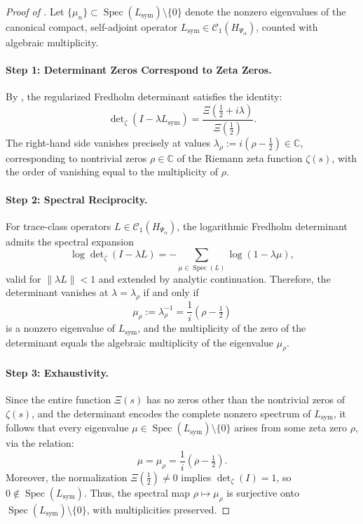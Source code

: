 \begin{proof}[Proof of ]
Let \( \{ \mu_n \} \subset \operatorname{Spec}(L_{\mathrm{sym}}) \setminus \{0\} \) denote the nonzero eigenvalues of the canonical compact, self-adjoint operator \( L_{\mathrm{sym}} \in \mathcal{C}_1(H_{\Psi_\alpha}) \), counted with algebraic multiplicity.

\paragraph{Step 1: Determinant Zeros Correspond to Zeta Zeros.}
By , the regularized Fredholm determinant satisfies the identity:
\[
\det\nolimits_\zeta(I - \lambda L_{\mathrm{sym}}) = \frac{\Xi(\tfrac{1}{2} + i\lambda)}{\Xi(\tfrac{1}{2})}.
\]
The right-hand side vanishes precisely at values \( \lambda_\rho := i(\rho - \tfrac{1}{2}) \in \mathbb{C} \), corresponding to nontrivial zeros \( \rho \in \mathbb{C} \) of the Riemann zeta function \( \zeta(s) \), with the order of vanishing equal to the multiplicity of \( \rho \).

\paragraph{Step 2: Spectral Reciprocity.}
For trace-class operators \( L \in \mathcal{C}_1(H_{\Psi_\alpha}) \), the logarithmic Fredholm determinant admits the spectral expansion
\[
\log \det\nolimits_\zeta(I - \lambda L) = -\sum_{\mu \in \operatorname{Spec}(L)} \log(1 - \lambda \mu),
\]
valid for \( \|\lambda L\| < 1 \) and extended by analytic continuation. Therefore, the determinant vanishes at \( \lambda = \lambda_\rho \) if and only if
\[
\mu_\rho := \lambda_\rho^{-1} = \frac{1}{i}(\rho - \tfrac{1}{2})
\]
is a nonzero eigenvalue of \( L_{\mathrm{sym}} \), and the multiplicity of the zero of the determinant equals the algebraic multiplicity of the eigenvalue \( \mu_\rho \).

\paragraph{Step 3: Exhaustivity.}
Since the entire function \( \Xi(s) \) has no zeros other than the nontrivial zeros of \( \zeta(s) \), and the determinant encodes the complete nonzero spectrum of \( L_{\mathrm{sym}} \), it follows that every eigenvalue \( \mu \in \operatorname{Spec}(L_{\mathrm{sym}}) \setminus \{0\} \) arises from some zeta zero \( \rho \), via the relation:
\[
\mu = \mu_\rho = \frac{1}{i}(\rho - \tfrac{1}{2}).
\]
Moreover, the normalization \( \Xi(\tfrac{1}{2}) \ne 0 \) implies \( \det\nolimits_\zeta(I) = 1 \), so \( 0 \notin \operatorname{Spec}(L_{\mathrm{sym}}) \). Thus, the spectral map \( \rho \mapsto \mu_\rho \) is surjective onto \( \operatorname{Spec}(L_{\mathrm{sym}}) \setminus \{0\} \), with multiplicities preserved.
\end{proof}
